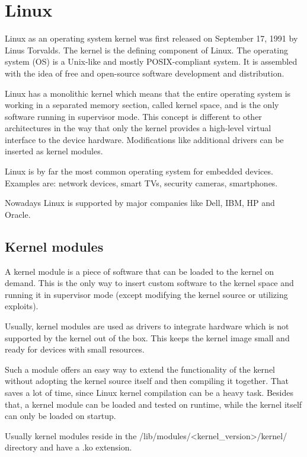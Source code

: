 \section{Linux}

Linux as an operating system kernel was first released on September 17, 1991 by Linus Torvalds. The kernel is the defining component of Linux. The operating system (OS) is a Unix-like and mostly POSIX-compliant system. It is assembled with the idea of free and open-source software development and distribution.

Linux has a monolithic kernel which means that the entire operating system is working in a separated memory section, called kernel space, and is the only software running in supervisor mode. This concept is different to other architectures in the way that only the kernel provides a high-level virtual interface to the device hardware. Modifications like additional drivers can be inserted as kernel modules.

Linux is by far the most common operating system for embedded devices. Examples are: network devices, smart TVs, security cameras, smartphones.

Nowadays Linux is supported by major companies like Dell, IBM, HP and Oracle.

\subsection{Kernel modules}

A kernel module is a piece of software that can be loaded to the kernel on demand. This is the only way to insert custom software to the kernel space and running it in supervisor mode (except modifying the kernel source or utilizing exploits).

Usually, kernel modules are used as drivers to integrate hardware which is not supported by the kernel out of the box. This keeps the kernel image small and ready for devices with small resources.

Such a module offers an easy way to extend the functionality of the kernel without adopting the kernel source itself and then compiling it together. That saves a lot of time, since Linux kernel compilation can be a heavy task. Besides that, a kernel module can be loaded and tested on runtime, while the kernel itself can only be loaded on startup.

Usually kernel modules reside in the /lib/modules/<kernel\_version>/kernel/ directory and have a .ko extension.


